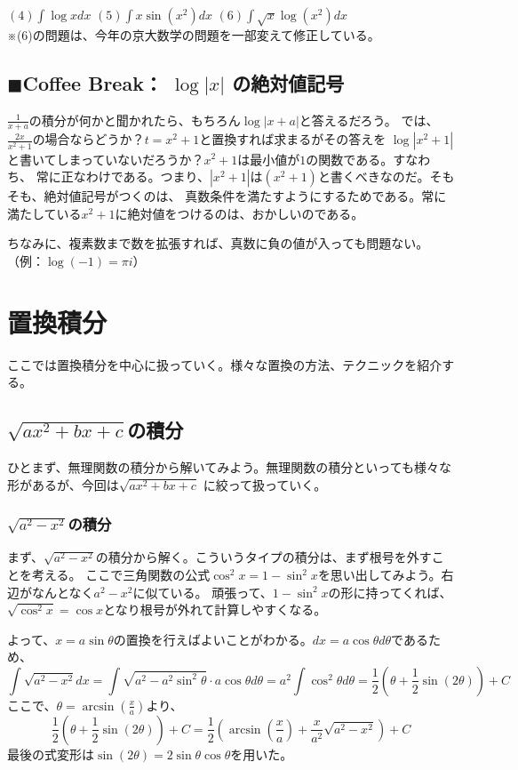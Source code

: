 \documentclass[a4j,dvipdfmx]{jsarticle}
\begin{document}
$(4)\displaystyle\int \log xdx$
\hspace{27mm}
$(5)\displaystyle\int x\sin(x^2)dx$
\hspace{24mm}
$(6)\displaystyle\int \sqrt{x}\log(x^2)dx$\\

※(6)の問題は、今年の京大数学の問題を一部変えて修正している。\\
\hrulefill
\subsection{$\blacksquare$Coffee Break： $\log |x|$ の絶対値記号}
\begin{screen}
    $\displaystyle\frac{1}{x+a}$の積分が何かと聞かれたら、もちろん$\log|x+a|$と答えるだろう。
    では、$\displaystyle\frac{2x}{x^2+1}$の場合ならどうか？$t=x^2+1$と置換すれば求まるがその答えを
    $\log|x^2+1|$と書いてしまっていないだろうか？$x^2+1$は最小値が$1$の関数である。すなわち、
    常に正なわけである。つまり、$|x^2+1|$は$(x^2+1)$と書くべきなのだ。そもそも、絶対値記号がつくのは、
    真数条件を満たすようにするためである。常に満たしている$x^2+1$に絶対値をつけるのは、おかしいのである。

    ちなみに、複素数まで数を拡張すれば、真数に負の値が入っても問題ない。（例：$\log(-1)=\pi i$）
\end{screen}
\newpage
\section{置換積分}
ここでは置換積分を中心に扱っていく。様々な置換の方法、テクニックを紹介する。
\subsection{$\sqrt{ax^2+bx+c}$の積分}
ひとまず、無理関数の積分から解いてみよう。無理関数の積分といっても様々な形があるが、今回は$\sqrt{ax^2+bx+c}$
に絞って扱っていく。
\subsubsection{$\sqrt{a^2-x^2}$の積分}
まず、$\sqrt{a^2-x^2}$の積分から解く。こういうタイプの積分は、まず根号を外すことを考える。
ここで三角関数の公式$\cos^2 x=1-\sin^2 x$を思い出してみよう。右辺がなんとなく$a^2-x^2$に似ている。
頑張って、$1-\sin^2 x$の形に持ってくれば、$\sqrt{\cos^2 x}=\cos x$となり根号が外れて計算しやすくなる。

よって、$x=a\sin \theta$の置換を行えばよいことがわかる。$dx=a\cos \theta d\theta$であるため、
\begin{equation*}
    \int \sqrt{a^2-x^2}dx=\int \sqrt{a^2-a^2\sin^2\theta}\cdot a\cos\theta d\theta
    =a^2\int \cos^2\theta d\theta=\frac{1}{2}(\theta+\frac{1}{2}\sin(2\theta))+C
\end{equation*}
ここで、$\theta =\arcsin(\frac{x}{a})$より、
\begin{equation*}
    \frac{1}{2}(\theta+\frac{1}{2}\sin(2\theta))+C=\frac{1}{2}(\arcsin(\frac{x}{a})+\frac{x}{a^2}\sqrt{a^2-x^2})+C
\end{equation*}
最後の式変形は$\sin(2\theta)=2\sin\theta\cos\theta$を用いた。
\end{document}
